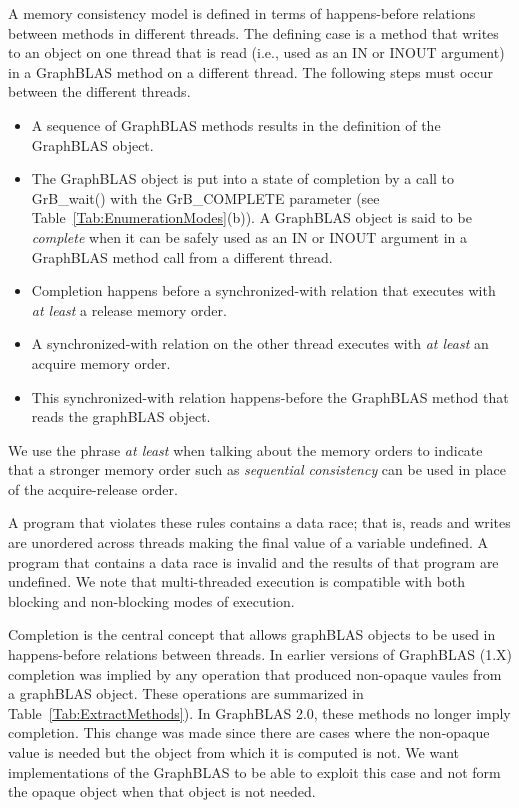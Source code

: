 A memory consistency model is defined in terms of happens-before relations between 
methods in different threads.  The defining case is a method that writes to an 
object on one thread that is read (i.e., used as an IN or INOUT argument) in a 
GraphBLAS method on a different thread.  The following steps must occur 
between the different threads.
\begin{itemize}
\item A sequence of GraphBLAS methods results in the definition of the GraphBLAS object.
\item The GraphBLAS object is put into a state of completion by a call to {\sf GrB\_wait()} 
with the {\sf GrB\_COMPLETE} parameter (see Table~\ref{Tab:EnumerationModes}(b)).  
A GraphBLAS object is said to be \emph{complete} when it can be safely used as an 
{\sf IN} or {\sf INOUT} argument in a GraphBLAS method call from a different thread. 
\item Completion happens before a synchronized-with relation that executes 
with \emph{at least} a release memory order.
\item A synchronized-with relation on the other thread executes with \emph{at 
least} an acquire memory order.
\item This synchronized-with relation happens-before the GraphBLAS method that 
reads the graphBLAS object.
\end{itemize}
We use the phrase \emph{at least} when talking about the memory orders to 
indicate that a stronger memory order such as \emph{sequential consistency} can 
be used in place of the acquire-release order.

A program that violates these rules contains a data race; that is, reads and writes are 
unordered across threads making the final value of a variable undefined.  A program that 
contains a data race is invalid and the results of that program are undefined.  
We note that multi-threaded execution is compatible with both blocking and non-blocking
modes of execution. 

Completion is the central concept that allows graphBLAS objects to be used in happens-before
relations between threads.  In earlier versions of GraphBLAS (1.X) completion was implied
by any operation that produced non-opaque vaules from a graphBLAS object.  These 
operations are summarized in  Table~\ref{Tab:ExtractMethods}).  In GraphBLAS 2.0, these 
methods no longer imply completion.  This change was made since there are cases where 
the non-opaque value is needed but the object from which it is computed is not. We
want implementations of the GraphBLAS to be able to exploit this case and not form the 
opaque object when that object is not needed.  

